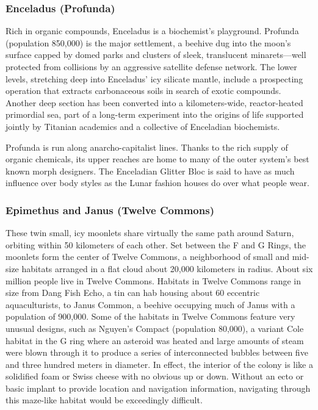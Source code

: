 \subsubsection{Enceladus (Profunda)} \label{sec:enceladus-profunda} 

Rich in organic compounds, Enceladus is a biochemist’s playground. Profunda (population 850,000) is the major settlement, a beehive dug into the moon’s surface capped by domed parks and clusters of sleek, translucent minarets—well protected from collisions by an aggressive satellite defense network. The lower levels, stretching deep into Enceladus’ icy silicate mantle, include a prospecting operation that extracts carbonaceous soils in search of exotic compounds. Another deep section has been converted into a kilometers-wide, reactor-heated primordial sea, part of a long-term experiment into the origins of life supported jointly by Titanian academics and a collective of Enceladian biochemists. 

Profunda is run along anarcho-capitalist lines. Thanks to the rich supply of organic chemicals, its upper reaches are home to many of the outer system’s best known morph designers. The Enceladian Glitter Bloc is said to have as much influence over body styles as the Lunar fashion houses do over what people wear. 

\subsubsection{Epimethus and Janus (Twelve Commons)} \label{sec:epim-janus-twelve} 

These twin small, icy moonlets share virtually the same path around Saturn, orbiting within 50 kilometers of each other. Set between the F and G Rings, the moonlets form the center of Twelve Commons, a neighborhood of small and mid-size habitats arranged in a flat cloud about 20,000 kilometers in radius. About six million people live in Twelve Commons. Habitats in Twelve Commons range in size from Dang Fish Echo, a tin can hab housing about 60 eccentric aquaculturists, to Janus Common, a beehive occupying much of Janus with a population of 900,000. Some of the habitats in Twelve Commons feature very unusual designs, such as Nguyen’s Compact (population 80,000), a variant Cole habitat in the G ring where an asteroid was heated and large amounts of steam were blown through it to produce a series of interconnected bubbles between five and three hundred meters in diameter. In effect, the interior of the colony is like a solidified foam or Swiss cheese with no obvious up or down. Without an ecto or basic implant to provide location and navigation information, navigating through this maze-like habitat would be exceedingly difficult. 

